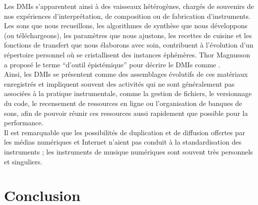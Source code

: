 \noindent Les \glspl{DMI} s'apparentent ainsi à des vaisseaux hétérogènes, chargés de souvenirs de nos expériences d'interprétation, de composition ou de fabrication d'instruments. Les sons que nous recueillons, les algorithmes de synthèse que nous développons (ou téléchargeons), les paramètres que nous ajustons, les recettes de cuisine et les fonctions de transfert que nous élaborons avec soin, contribuent à l'évolution d'un répertoire personnel où se cristallisent des instances éphémères. Thor Magnusson a proposé le terme ``d'outil épistémique'' pour décrire le \glspl{DMI} comme  \cite{magnusson_epistemic_2009}.\\
\indent Ainsi, les \glspl{DMI} se présentent comme des assemblages évolutifs de ces matériaux enregistrés et impliquent souvent des activités qui ne sont généralement pas associées à la pratique instrumentale, comme la gestion de fichiers, le versionnage du code, le recensement de ressources en ligne ou l'organisation de banques de sons, afin de pouvoir réunir ces ressources aussi rapidement que possible pour la performance.\\
\indent Il est remarquable que les possibilités de duplication et de diffusion offertes par les médias numériques et Internet n'aient pas conduit à la standardisation des instruments ; les instruments de musique numériques sont souvent très personnels et singuliers.

\section{Conclusion}

